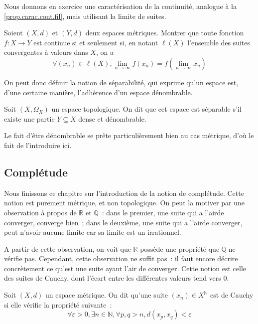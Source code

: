 Nous donnons en exercice une caractérisation de la continuité, analogue à la
\cref{prop.carac.cont.fil}, mais utilisant la limite de suites.

\begin{exercise}\label{exo.carac.cont.suit}
  Soient $(X,d)$ et $(Y,d)$ deux espaces métriques. Montrer que toute fonction
  $f : X \to Y$ est continue si et seulement si, en notant $\ell(X)$ l'ensemble
  des suites convergentes à valeurs dans $X$, on a
  \[\forall (x_n) \in \ell(X),
  \lim_{n \to \infty} f(x_n) = f(\lim_{n\to\infty} x_n)\]
\end{exercise}

On peut donc définir la notion de séparabilité, qui exprime qu'un espace est,
d'une certaine manière, l'adhérence d'un espace dénombrable.

\begin{definition}
  Soit $(X,\Omega_X)$ un espace topologique. On dit que cet espace est
  séparable s'il existe une partie $Y\subseteq X$ dense et dénombrable.
\end{definition}

Le fait d'être dénombrable se prête particulièrement bien au cas métrique,
d'où le fait de l'introduire ici.

\subsection{Complétude}

Nous finissons ce chapitre sur l'introduction de la notion de complétude. Cette
notion est purement métrique, et non topologique. On peut la motiver par une
observation à propos de $\mathbb R$ et $\mathbb Q$~: dans le premier, une
suite qui \og a l'air\fg de converger, converge bien~; dans le deuxième,
une suite qui \og a l'air\fg de converger, peut n'avoir aucune limite car sa
limite est un irrationnel.

A partir de cette observation, on voit que $\mathbb R$ possède une propriété que
$\mathbb Q$ ne vérifie pas. Cependant, cette observation ne suffit pas~: il faut
encore décrire concrètement ce qu'est une suite ayant l'air de converger. Cette
notion est celle des suites de Cauchy, dont l'écart entre les différentes
valeurs tend vers $0$.

\begin{definition}
  Soit $(X,d)$ un espace métrique. On dit qu'une suite $(x_n)\in X^\mathbb N$
  est de Cauchy si elle vérifie la propriété suivante~:
  \[\forall \varepsilon > 0, \exists n \in \mathbb N, \forall p,q > n,
  d(x_p,x_q) < \varepsilon\]
\end{definition}

